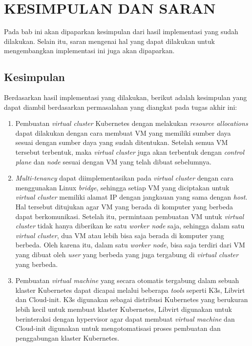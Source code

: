 \chapter{KESIMPULAN DAN SARAN}
\label{chap:penutup}

Pada bab ini akan dipaparkan kesimpulan dari hasil implementasi
yang sudah dilakukan. Selain itu, saran mengenai hal yang dapat
dilakukan untuk mengembangkan implementasi ini juga akan dipaparkan.

\section{Kesimpulan}
\label{sec:kesimpulan}

Berdasarkan hasil implementasi yang dilakukan, berikut adalah
kesimpulan yang dapat diambil berdasarkan permasalahan yang diangkat
pada tugas akhir ini:

\begin{enumerate}[nolistsep]

  \item Pembuatan \emph{virtual cluster} Kubernetes dengan melakukan \emph{resource allocations}
    dapat dilakukan dengan cara membuat VM yang memiliki sumber daya sesuai dengan
    sumber daya yang sudah ditentukan. Setelah semua VM tersebut terbentuk, maka \emph{virtual cluster}
    juga akan terbentuk dengan \emph{control plane} dan \emph{node} sesuai dengan VM yang telah dibuat
    sebelumnya.

  \item \emph{Multi-tenancy} dapat diimplementasikan pada \emph{virtual cluster}
    dengan cara menggunakan Linux \emph{bridge}, sehingga setiap VM yang diciptakan
    untuk \emph{virtual cluster} memiliki alamat IP dengan jangkauan yang sama dengan
    \emph{host}. Hal tersebut ditujukan agar VM yang berada di komputer yang berbeda dapat
    berkomunikasi. Setelah itu, permintaan pembuatan VM untuk \emph{virtual cluster}
    tidak hanya diberikan ke satu \emph{worker node} saja, sehingga dalam satu \emph{virtual cluster},
    dua VM atau lebih bisa saja berada di komputer yang berbeda. Oleh karena itu, dalam satu \emph{worker node},
    bisa saja terdiri dari VM yang dibuat oleh \emph{user} yang berbeda yang juga tergabung
    di \emph{virtual cluster} yang berbeda.

  \item Pembuatan \emph{virtual machine} yang secara otomatis tergabung
    dalam sebuah klaster Kubernetes dapat dicapai melalui beberapa \emph{tools}
    seperti K3s, Libvirt dan Cloud-init. K3s digunakan sebagai distribusi
    Kubernetes yang berukuran lebih kecil untuk membuat klaster Kubernetes,
    Libvirt digunakan untuk berinteraksi dengan hypervisor agar dapat membuat 
    \emph{virtual machine} dan Cloud-init digunakan untuk mengotomatisasi proses
    pembuatan dan penggabungan klaster Kubernetes.

\end{enumerate}

